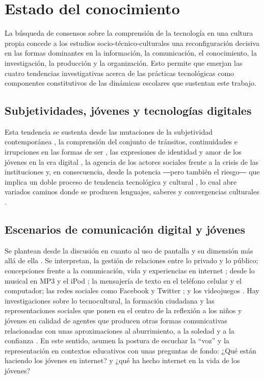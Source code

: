 \documentclass{textolivre}
\begin{document}
\section{Estado del conocimiento}\label{sec-estado}
La búsqueda de consensos sobre la comprensión de la tecnología en una cultura propia concede a los estudios socio-técnico-culturales \cite{levy_cibercultura._2007} una reconfiguración decisiva en las formas dominantes en la información, la comunicación, el conocimiento, la investigación, la producción y la organización. Esto permite que emerjan las cuatro tendencias investigativas acerca de las prácticas tecnológicas como componentes constitutivos de las dinámicas escolares que sustentan este trabajo.

\subsection{Subjetividades, jóvenes y tecnologías digitales}\label{sec-subjetividades}
Esta tendencia se sustenta desde las mutaciones de la subjetividad contemporánea \cite{amador_mutaciones_2010, erazo_caicedo_mediaciones_2006}, la comprensión del conjunto de tránsitos, continuidades e irrupciones en las formas de ser \cite{acosta_juventud_2012, mejia_tecnologi_2004, rueda_ortiz_cibercultura:_2008}, las expresiones de identidad y amor de los jóvenes en la era digital \cite{richardson_promposal:_2017}, la agencia de los actores sociales frente a la crisis de las instituciones y, en consecuencia, desde la potencia ―pero también el riesgo― que implica un doble proceso de tendencia tecnológica y cultural \cite{odgers_adolescent_2020, rueda_ortiz_convergencia_2009}, lo cual abre variados caminos donde se producen lenguajes, saberes y convergencias culturales \cite{munoz_culturas_2010a}.

\subsection{Escenarios de comunicación digital y jóvenes}\label{sec-escenarios}
Se plantean desde la discusión en cuanto al uso de pantalla y su dimensión más allá de ella \cite{munoz_2010c}. Se interpretan, la gestión de relaciones entre lo privado y lo público; concepciones frente a la comunicación, vida y experiencias en internet \cite{fonseca_redes_2015}; desde lo musical en MP3 y el iPod \cite{pelaez_coleccion_2010}; la mensajería de texto en el teléfono celular \cite{galindo_mensajerien_2010} y el computador; las redes sociales como Facebook y Twitter \cite{menzies_case_2017, munoz_redes_2010b}; y los videojuegos \cite{alba_pegados_2010}. Hay investigaciones sobre lo tecnocultural, la formación ciudadana y las representaciones sociales que ponen en el centro de la reflexión a los niños y jóvenes en calidad de agentes que producen otras formas comunicativas relacionadas con unas aproximaciones al aburrimiento, a la soledad y a la confianza \cite{soler_fonseca_confianza_2016}. En este sentido, asumen la postura de escuchar la “voz” y la representación en contextos educativos \cite{dahya_critical_2017} con unas preguntas de fondo: ¿Qué están haciendo los jóvenes en internet? y ¿qué ha hecho internet en la vida de los jóvenes?
\end{document}
